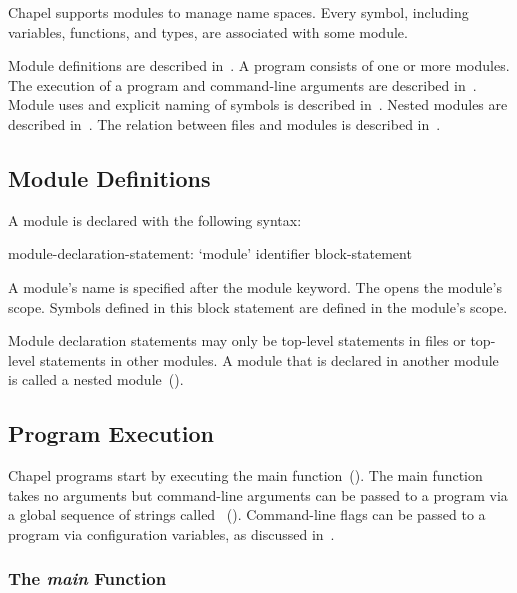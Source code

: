 \label{Modules}


Chapel supports modules to manage name spaces.  Every symbol,
including variables, functions, and types, are associated with some
module.

Module definitions are described in~.  A
program consists of one or more modules.  The execution of a program
and command-line arguments are described in~.
Module uses and explicit naming of symbols is described
in~.  Nested modules are described
in~.  The relation between files and modules is
described in~.

\subsection{Module Definitions}
\label{Module_Definitions}


A module is declared with the following syntax:
\begin{syntax}
module-declaration-statement:
  `module' identifier block-statement
\end{syntax}
A module's name is specified after the module keyword.
The  opens the module's scope.  Symbols defined
in this block statement are defined in the module's scope.

Module declaration statements may only be top-level statements in
files or top-level statements in other modules.  A module that is
declared in another module is called a nested
module~().

\subsection{Program Execution}
\label{Program_Execution}

Chapel programs start by executing the main
function~().  The main function takes no
arguments but command-line arguments can be passed to a program via a
global sequence of strings
called ~().  Command-line
flags can be passed to a program via configuration variables, as
discussed in~.

\subsubsection{The {\em main} Function}
\label{The_main_Function}


